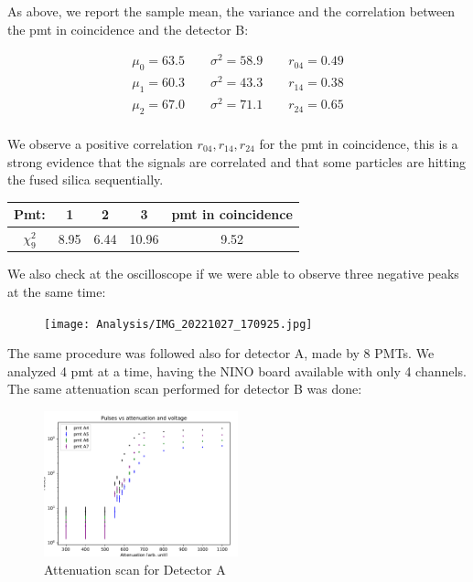 As above, we report the sample mean, the variance and the correlation between the pmt in coincidence and the detector B:

\begin{equation*}
\begin{split}
\mu_{0} = 63.5 \qquad \sigma^{2} = 58.9 \qquad r_{04} = 0.49 \\
\mu_{1} = 60.3 \qquad \sigma^{2} = 43.3 \qquad r_{14} = 0.38 \\
\mu_{2} = 67.0 \qquad \sigma^{2} = 71.1 \qquad r_{24} = 0.65 \\
\end{split}
\end{equation*}

We observe a positive correlation $r_{04},r_{14},r_{24}$ for the pmt in coincidence, this is a strong evidence that the signals are correlated and that some particles are hitting the fused silica sequentially. \smallskip

\begingroup
\setlength{\tabcolsep}{8pt} %
\renewcommand{\arraystretch}{1.2} %
\begin{center}
\begin{tabular}{|c|c|c|c|c|}
\hline 
Pmt: & 1 & 2 & 3 & pmt in coincidence \\ 
\hline
$\chi^{2}_{9}$ & 8.95 & 6.44 & 10.96 & 9.52\\ 
\hline
\end{tabular} 
\end{center}
\endgroup
\smallskip

We also check at the oscilloscope if we were able to observe three negative peaks at the same time: 

\begin{figure}
\centering
\texttt{[image: Analysis/IMG\_20221027\_170925.jpg]} 
\end{figure}

The same procedure was followed also for detector A, made by 8 PMTs. We analyzed 4 pmt at a time, having the NINO board available with only 4 channels. The same attenuation scan performed for detector B was done:

\begin{figure}[hbtp]

\centering
\includegraphics[width = 0.5\textwidth]{Analysis/AttenuationA(4-7).pdf}
\caption{Attenuation scan for Detector A}
\end{figure}

